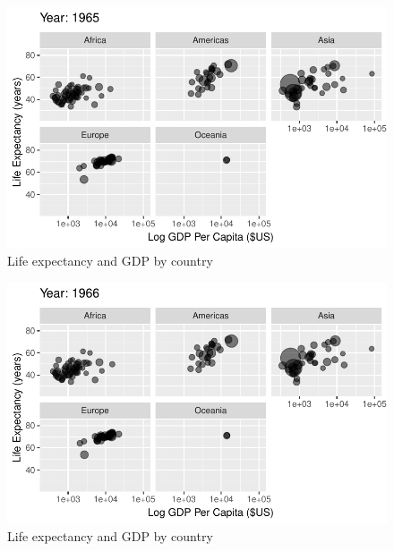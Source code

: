 \documentclass[
  letterpaper,
  DIV=11,
  numbers=noendperiod]{scrreport}
\theoremstyle{definition}
\theoremstyle{remark}
\begin{document}
\begin{figure}

{\centering \includegraphics{index_files/figure-pdf/fig-anim-lifegdp-25.pdf}

}

\caption{\label{fig-anim-lifegdp-25}Life expectancy and GDP by country}

\end{figure}

\begin{figure}

{\centering \includegraphics{index_files/figure-pdf/fig-anim-lifegdp-26.pdf}

}

\caption{\label{fig-anim-lifegdp-26}Life expectancy and GDP by country}

\end{figure}
\end{document}
